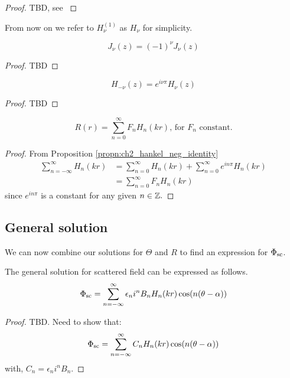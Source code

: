   \begin{proof}
      TBD, see \cite[$\S$4.2]{martin06scattering}
  \end{proof}\par
%
From now on we refer to $H^{(1)}_\nu$ as $H_\nu$ for simplicity.
  \begin{propn}
    \[
    J_\nu(z) = (-1)^\nu J_\nu(z)
    \]
  \end{propn}
  \begin{proof}
    TBD
  \end{proof}
%
  \begin{propn}\label{propn:ch2_hankel_neg_identity}
    \[
    H_{-\nu}(z) = e^{i\nu \pi}H_\nu(z)
    \]
  \end{propn}
  \begin{proof}
    TBD
  \end{proof}
%
  \begin{propn}
    \begin{equation*}
      R(r) = \sum^\infty_{n=0} F_n H_n(kr) \text{, for $F_n$ constant.}
    \end{equation*}
  \end{propn}
  \begin{proof}
    From Proposition \ref{propn:ch2_hankel_neg_identity}
      \begin{align*}
        \sum^\infty_{n=-\infty} H_n(kr)
        & = \sum^\infty_{n=0} H_n(kr) + \sum^\infty_{n=0} e^{in\pi} H_n(kr)\\
        & = \sum^\infty_{n=0} F_n H_n(kr)
      \end{align*}
    since $e^{in\pi}$ is a constant for any given $n \in \mathbb{Z}.$
  \end{proof}
\subsection{General solution}
We can now combine our solutions for $\Theta$ and $R$ to find an expression for $\Phi_{\text{sc}}$.
%
    \begin{propn}
      The general solution for scattered field can be expressed as follows.
        \begin{equation} \label{eq:ch2_gen_eq_scattered_field}
            \Phi_{\text{sc}} = \sum^\infty_{n=-\infty} \epsilon_n i^n B_n H_n(kr) \cos(n(\theta-\alpha))
        \end{equation}
    \end{propn}
    \begin{proof} TBD. Need to show that:
      \[
      \Phi_{\text{sc}} = \sum^\infty_{n=-\infty} C_n H_n(kr) \cos(n(\theta-\alpha))
      \]
      with, $C_n = \epsilon_n i^n B_n$.
    \end{proof}

